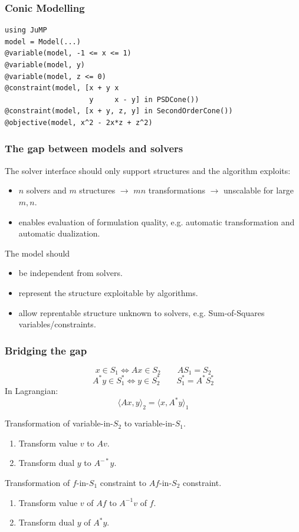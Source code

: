 \documentclass{beamer}
\begin{document}
  \begin{frame}[fragile]
    \frametitle{Conic Modelling}
\begin{verbatim}
using JuMP
model = Model(...)
@variable(model, -1 <= x <= 1)
@variable(model, y)
@variable(model, z <= 0)
@constraint(model, [x + y x
                    y     x - y] in PSDCone())
@constraint(model, [x + y, z, y] in SecondOrderCone())
@objective(model, x^2 - 2x*z + z^2)
\end{verbatim}
  \end{frame}

  \begin{frame}
    \frametitle{The gap between models and solvers}
    The solver interface should only support structures and the algorithm \alert{exploits}:
    \begin{itemize}
      \item
        $n$ solvers and $m$ structures $\to$ $mn$ transformations $\to$ \alert{unscalable} for large $m, n$.
      \item
        enables \alert{evaluation} of formulation \alert{quality}, e.g. automatic transformation and
        automatic dualization.
    \end{itemize}

    The model should
    \begin{itemize}
      \item be \alert{independent} from solvers.
      \item represent the structure \alert{exploitable} by algorithms.
      \item allow reprentable structure \alert{unknown} to solvers, e.g. Sum-of-Squares variables/constraints.
    \end{itemize}
  \end{frame}

  \begin{frame}
    \frametitle{Bridging the gap}
    \[ x \in S_1 \Leftrightarrow Ax \in S_2 \qquad AS_1 = S_2 \]
    \[ A^* y \in S_1^* \Leftrightarrow y \in S_2^* \qquad S_1^* = A^* S_2^* \]
    In Lagrangian:
    \[ \langle Ax, y \rangle_2 = \langle x, A^* y \rangle_1 \]
    \vspace{-0.5cm}
    \begin{block}{Transformation of variable-in-$S_2$ to variable-in-$S_1$.}
      \begin{enumerate}
        \item[Primal] Transform value $v$ to $Av$.
        \item[Dual] Transform dual $y$ to $A^{-*}y$.
      \end{enumerate}
    \end{block}
    \begin{block}{Transformation of $f$-in-$S_1$ constraint to $Af$-in-$S_2$ constraint.}

      \begin{enumerate}
        \item[Primal] Transform value $v$ of $Af$ to $A^{-1}v$ of $f$.
        \item[Dual] Transform dual $y$ of $A^*y$.
      \end{enumerate}
    \end{block}
  \end{frame}
\end{document}
